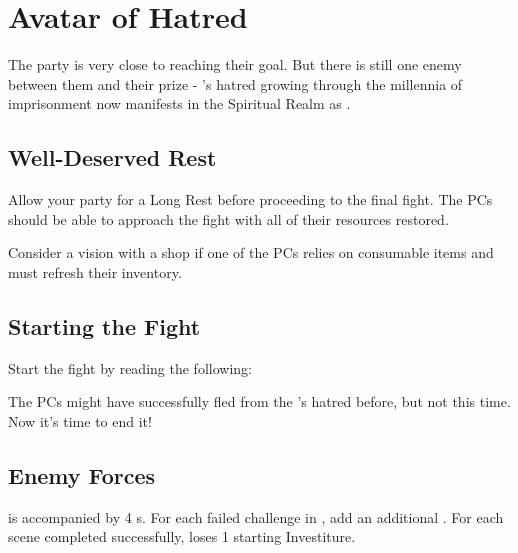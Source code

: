\section{Avatar of Hatred}
\label{sec:avatarOfHatred}

The party is very close to reaching their goal. But there is still one enemy between them and their prize - \npcMishram{}'s hatred growing through the millennia of imprisonment now manifests in the Spiritual Realm as \enemyMishram{}.




\subsection{Well-Deserved Rest}

Allow your party for a Long Rest before proceeding to the final fight. The PCs should be able to approach the fight with all of their resources restored.

Consider a vision with a shop if one of the PCs relies on consumable items and must refresh their inventory.


\subsection{Starting the Fight}

Start the fight by reading the following:


The PCs might have successfully fled from the \npcMishram{}'s hatred before, but not this time. Now it's  time to end it!


\subsection{Enemy Forces}

\enemyMishram{} is accompanied by 4 \enemySingerWarform{}s. For each failed challenge in , add an additional \enemySingerWarform{}. For each scene completed successfully, \enemyMishram{} loses 1 starting Investiture.

